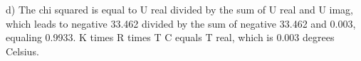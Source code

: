d) The chi squared is equal to U real divided by the sum of U real and U imag, which leads to negative 33.462 divided by the sum of negative 33.462 and 0.003, equaling 0.9933. K times R times T C equals T real, which is 0.003 degrees Celsius.